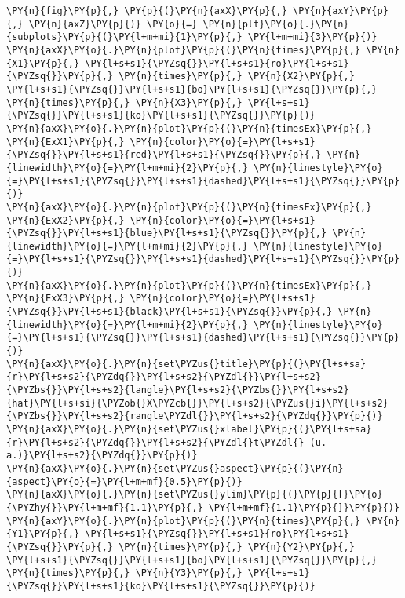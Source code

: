     \begin{tcolorbox}[breakable, size=fbox, boxrule=1pt, pad at break*=1mm,colback=cellbackground, colframe=cellborder]
\begin{Verbatim}[commandchars=\\\{\}]
\PY{n}{fig}\PY{p}{,} \PY{p}{(}\PY{n}{axX}\PY{p}{,} \PY{n}{axY}\PY{p}{,} \PY{n}{axZ}\PY{p}{)} \PY{o}{=} \PY{n}{plt}\PY{o}{.}\PY{n}{subplots}\PY{p}{(}\PY{l+m+mi}{1}\PY{p}{,} \PY{l+m+mi}{3}\PY{p}{)}
\PY{n}{axX}\PY{o}{.}\PY{n}{plot}\PY{p}{(}\PY{n}{times}\PY{p}{,} \PY{n}{X1}\PY{p}{,} \PY{l+s+s1}{\PYZsq{}}\PY{l+s+s1}{ro}\PY{l+s+s1}{\PYZsq{}}\PY{p}{,} \PY{n}{times}\PY{p}{,} \PY{n}{X2}\PY{p}{,} \PY{l+s+s1}{\PYZsq{}}\PY{l+s+s1}{bo}\PY{l+s+s1}{\PYZsq{}}\PY{p}{,} \PY{n}{times}\PY{p}{,} \PY{n}{X3}\PY{p}{,} \PY{l+s+s1}{\PYZsq{}}\PY{l+s+s1}{ko}\PY{l+s+s1}{\PYZsq{}}\PY{p}{)}
\PY{n}{axX}\PY{o}{.}\PY{n}{plot}\PY{p}{(}\PY{n}{timesEx}\PY{p}{,} \PY{n}{ExX1}\PY{p}{,} \PY{n}{color}\PY{o}{=}\PY{l+s+s1}{\PYZsq{}}\PY{l+s+s1}{red}\PY{l+s+s1}{\PYZsq{}}\PY{p}{,} \PY{n}{linewidth}\PY{o}{=}\PY{l+m+mi}{2}\PY{p}{,} \PY{n}{linestyle}\PY{o}{=}\PY{l+s+s1}{\PYZsq{}}\PY{l+s+s1}{dashed}\PY{l+s+s1}{\PYZsq{}}\PY{p}{)}
\PY{n}{axX}\PY{o}{.}\PY{n}{plot}\PY{p}{(}\PY{n}{timesEx}\PY{p}{,} \PY{n}{ExX2}\PY{p}{,} \PY{n}{color}\PY{o}{=}\PY{l+s+s1}{\PYZsq{}}\PY{l+s+s1}{blue}\PY{l+s+s1}{\PYZsq{}}\PY{p}{,} \PY{n}{linewidth}\PY{o}{=}\PY{l+m+mi}{2}\PY{p}{,} \PY{n}{linestyle}\PY{o}{=}\PY{l+s+s1}{\PYZsq{}}\PY{l+s+s1}{dashed}\PY{l+s+s1}{\PYZsq{}}\PY{p}{)}
\PY{n}{axX}\PY{o}{.}\PY{n}{plot}\PY{p}{(}\PY{n}{timesEx}\PY{p}{,} \PY{n}{ExX3}\PY{p}{,} \PY{n}{color}\PY{o}{=}\PY{l+s+s1}{\PYZsq{}}\PY{l+s+s1}{black}\PY{l+s+s1}{\PYZsq{}}\PY{p}{,} \PY{n}{linewidth}\PY{o}{=}\PY{l+m+mi}{2}\PY{p}{,} \PY{n}{linestyle}\PY{o}{=}\PY{l+s+s1}{\PYZsq{}}\PY{l+s+s1}{dashed}\PY{l+s+s1}{\PYZsq{}}\PY{p}{)}
\PY{n}{axX}\PY{o}{.}\PY{n}{set\PYZus{}title}\PY{p}{(}\PY{l+s+sa}{r}\PY{l+s+s2}{\PYZdq{}}\PY{l+s+s2}{\PYZdl{}}\PY{l+s+s2}{\PYZbs{}}\PY{l+s+s2}{langle}\PY{l+s+s2}{\PYZbs{}}\PY{l+s+s2}{hat}\PY{l+s+si}{\PYZob{}X\PYZcb{}}\PY{l+s+s2}{\PYZus{}i}\PY{l+s+s2}{\PYZbs{}}\PY{l+s+s2}{rangle\PYZdl{}}\PY{l+s+s2}{\PYZdq{}}\PY{p}{)}
\PY{n}{axX}\PY{o}{.}\PY{n}{set\PYZus{}xlabel}\PY{p}{(}\PY{l+s+sa}{r}\PY{l+s+s2}{\PYZdq{}}\PY{l+s+s2}{\PYZdl{}t\PYZdl{} (u. a.)}\PY{l+s+s2}{\PYZdq{}}\PY{p}{)}
\PY{n}{axX}\PY{o}{.}\PY{n}{set\PYZus{}aspect}\PY{p}{(}\PY{n}{aspect}\PY{o}{=}\PY{l+m+mf}{0.5}\PY{p}{)}
\PY{n}{axX}\PY{o}{.}\PY{n}{set\PYZus{}ylim}\PY{p}{(}\PY{p}{[}\PY{o}{\PYZhy{}}\PY{l+m+mf}{1.1}\PY{p}{,} \PY{l+m+mf}{1.1}\PY{p}{]}\PY{p}{)}
\PY{n}{axY}\PY{o}{.}\PY{n}{plot}\PY{p}{(}\PY{n}{times}\PY{p}{,} \PY{n}{Y1}\PY{p}{,} \PY{l+s+s1}{\PYZsq{}}\PY{l+s+s1}{ro}\PY{l+s+s1}{\PYZsq{}}\PY{p}{,} \PY{n}{times}\PY{p}{,} \PY{n}{Y2}\PY{p}{,} \PY{l+s+s1}{\PYZsq{}}\PY{l+s+s1}{bo}\PY{l+s+s1}{\PYZsq{}}\PY{p}{,} \PY{n}{times}\PY{p}{,} \PY{n}{Y3}\PY{p}{,} \PY{l+s+s1}{\PYZsq{}}\PY{l+s+s1}{ko}\PY{l+s+s1}{\PYZsq{}}\PY{p}{)}

\end{Verbatim}
\end{tcolorbox}
